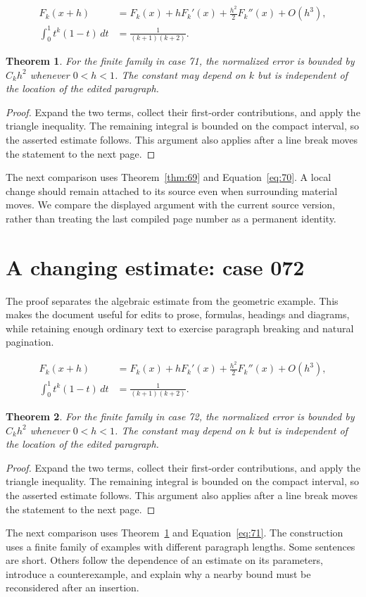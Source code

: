 \documentclass[a4paper,10pt]{article}
\newtheorem{theorem}{Theorem}[section]
\begin{document}
\lipsum[1-2]
\begin{align}\label{eq:70}
 F_k(x+h)&=F_k(x)+hF_k'(x)+\frac{h^2}{2}F_k''(x)+O(h^3),\\
 \int_0^1 t^k(1-t)\,dt&=\frac{1}{(k+1)(k+2)}.
\end{align}
\begin{theorem}\label{thm:70}
For the finite family in case 71, the normalized error is bounded by $C_k h^2$ whenever $0<h<1$. The constant may depend on $k$ but is independent of the location of the edited paragraph.
\end{theorem}
\begin{proof}
Expand the two terms, collect their first-order contributions, and apply the
triangle inequality. The remaining integral is bounded on the compact interval,
so the asserted estimate follows. This argument also applies after a line break
moves the statement to the next page.
\end{proof}
The next comparison uses Theorem~\ref{thm:69} and Equation~\ref{eq:70}. A local change should remain attached to its source even when surrounding material moves. We compare the displayed argument with the current source version, rather than treating the last compiled page number as a permanent identity.

\lipsum[3]

\section{A changing estimate: case 072}\label{unit:71}
The proof separates the algebraic estimate from the geometric example. This makes the document useful for edits to prose, formulas, headings and diagrams, while retaining enough ordinary text to exercise paragraph breaking and natural pagination.

\lipsum[4-5]
\begin{align}\label{eq:71}
 F_k(x+h)&=F_k(x)+hF_k'(x)+\frac{h^2}{2}F_k''(x)+O(h^3),\\
 \int_0^1 t^k(1-t)\,dt&=\frac{1}{(k+1)(k+2)}.
\end{align}
\begin{theorem}\label{thm:71}
For the finite family in case 72, the normalized error is bounded by $C_k h^2$ whenever $0<h<1$. The constant may depend on $k$ but is independent of the location of the edited paragraph.
\end{theorem}
\begin{proof}
Expand the two terms, collect their first-order contributions, and apply the
triangle inequality. The remaining integral is bounded on the compact interval,
so the asserted estimate follows. This argument also applies after a line break
moves the statement to the next page.
\end{proof}
The next comparison uses Theorem~\ref{thm:70} and Equation~\ref{eq:71}. The construction uses a finite family of examples with different paragraph lengths. Some sentences are short. Others follow the dependence of an estimate on its parameters, introduce a counterexample, and explain why a nearby bound must be reconsidered after an insertion.
\end{document}
